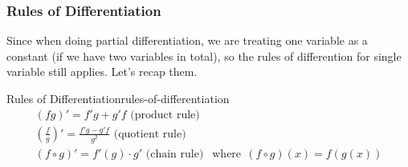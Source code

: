 \documentclass[math,code]{amznotes}
\theoremstyle{remark}
\begin{document}
\subsubsection{Rules of Differentiation}
Since when doing partial differentiation, we are treating one variable as a constant (if we have two variables in total), so the rules of differention for single variable still applies. Let's recap them.
\begin{thmbox}{Rules of Differentiation}{rules-of-differentiation}
    \begin{gather*}
        (fg)' = f'g+g'f \text{ (product rule)} \\
        (\frac{f}{g})'=\frac{f'g-g'f}{g^2} \text{ (quotient rule)} \\
        (f \circ g)' = f'(g) \cdot g' \text{ (chain rule) } ~~\text{where}~~ (f \circ g)(x) = f(g(x)) 
    \end{gather*}
\end{thmbox}
\end{document}
